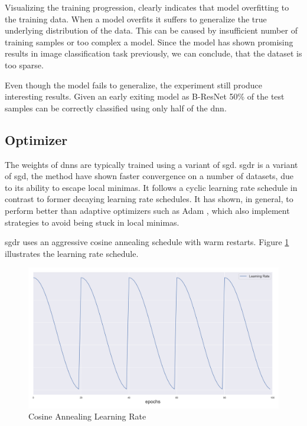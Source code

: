 Visualizing the training progression, clearly indicates that model overfitting to the training data. When a model overfits it suffers to generalize the true underlying distribution of the data. This can be caused by insufficient number of training samples or too complex a model. Since the model has shown promising results in image classification task previously, we can conclude, that the dataset is too sparse.

Even though the model fails to generalize, the experiment still produce interesting results. Given an early exiting model as B-ResNet 50\% of the test samples can be correctly classified using only half of the \gls{dnn}.

\subsection{Optimizer}

The weights of \gls{dnn}s are typically trained using a variant of \gls{sgd}. \gls{sgdr} \cite{loshchilov_sgdr:_2016} is a variant of \gls{sgd}, the method have shown faster convergence on a number of datasets, due to its ability to escape local minimas. It follows a cyclic learning rate schedule in contrast to former decaying learning rate schedules. It has shown, in general, to perform better than adaptive optimizers such as Adam \cite{kingma_adam:_2014}, which also implement strategies to avoid being stuck in local minimas. 

\gls{sgdr} uses an aggressive cosine annealing schedule with warm restarts. Figure \ref{fig:cosineannealing} illustrates the learning rate schedule.

\begin{figure}
	\centering
	\includegraphics[width=\linewidth]{figures/lr.png}
	\caption[Cosine Annealing Learning Rate]{Cosine Annealing Learning Rate} \label{fig:cosineannealing}
\end{figure}

